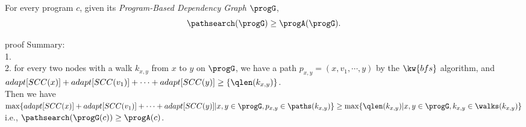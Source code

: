 \begin{thm}
  \label{thm:sound_adaptalg}
  For every program $c$, given its \emph{Program-Based Dependency Graph} $\progG$,
   $$\pathsearch(\progG) \geq \progA(\progG).$$
\end{thm}
proof Summary:
\\
1. 
\\
2. for every two nodes with a walk $k_{x,y}$ from $x$ to $y$ on $\progG$, we have a path
 $p_{x,y} = (x, v_1, \cdots, y)$ by the $\kw{bfs}$ algorithm,
and $adapt[SCC(x)] + adapt[SCC(v_1)] + \cdots + adapt[SCC(y)] \geq \{\qlen(k_{x,y})\}$.
\\
Then we have
$\max\{adapt[SCC(x)] + adapt[SCC(v_1)] + \cdots + adapt[SCC(y)] | x, y \in \progG, p_{x,y} \in \paths(k_{x,y}) \}
\geq \max\{\qlen(k_{x,y}) | x, y \in \progG, k_{x,y} \in \walks(k_{x,y})\}$
\\
i.e., 
$\pathsearch(\progG(c)) \geq \progA(c)$.
